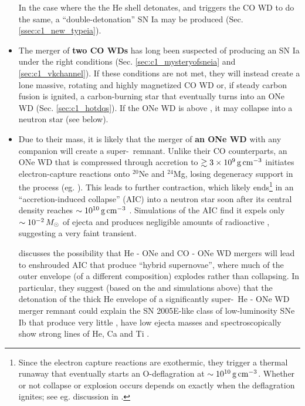 \begin{itemize}


In the case where the the He shell detonates, and triggers the CO WD to do the same, a ``double-detonation'' SN Ia may be produced (Sec. \ref{ssec:c1_new_typeia}).

	\item The merger of {\bf two CO WDs} has long been suspected of producing an SN Ia under the right conditions (Sec. \ref{sec:c1_mysteryofsneia} and \ref{sec:c1_vkchannel}).  If these conditions are not met, they will instead create a lone massive, rotating and highly magnetized CO WD or, if steady carbon fusion is ignited, a carbon-burning star that eventually turns into an ONe WD (Sec. \ref{sec:c1_hotdqs}).  If the ONe WD is above \Mch, it may collapse into a neutron star (see below).

	\item Due to their mass, it is likely that the merger of {\bf an ONe WD} with any companion will create a super-\Mch\ remnant.  Unlike their CO counterparts, an ONe WD that is compressed through accretion to $\gtrsim3\times10^9\,\gcc$ initiates electron-capture reactions onto $^{20}$Ne and $^{24}$Mg, losing degeneracy support in the process (eg. \citealt{miya+80, saion85, schwqb15}).  This leads to further contraction, which likely ends\footnote{Since the electron capture reactions are exothermic, they trigger a thermal runaway that eventually starts an O-deflagration at $\sim10^{10}\,\gcc$.  Whether or not collapse or explosion occurs depends on exactly when the deflagration ignites; see eg. discussion in \cite{schwqb15}.} in an ``accretion-induced collapse'' (AIC) into a neutron star soon after its central density reaches $\sim10^{10}\,\gcc$ \citep{schwqb15}.  Simulations \citep{dess+06, dess+07, frye+09} of the AIC find it expels only $\sim10^{-2}\,\Msun$ of ejecta and produces negligible amounts of radioactive \Ni, suggesting a very faint transient.


\cite{dan+14} discusses the possibility that He - ONe and CO - ONe WD mergers will lead to enshrouded AIC that produce ``hybrid supernovae'', where much of the outer envelope (of a different composition) explodes rather than collapsing.  In particular, they suggest (based on the \cite{shen+10he} and \cite{wald+11} simulations above) that the detonation of the thick He envelope of a significantly super-\Mch\ He - ONe WD merger remnant could  explain the SN 2005E-like class of low-luminosity SNe Ib that produce very little \Ni, have low ejecta masses and spectroscopically show strong lines of He, Ca and Ti \citep{pere+10}.


\end{itemize}
